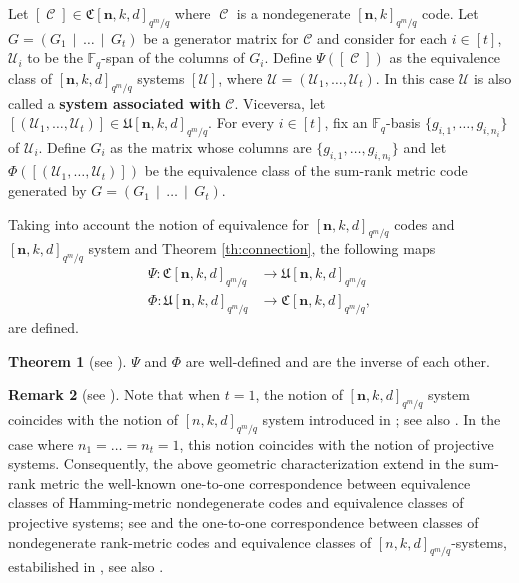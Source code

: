 \documentclass[11pt]{amsart}
\DeclareMathOperator{\C}{\mathcal{C}}
\theoremstyle{definition}
\newtheorem{theorem}{Theorem}[section]
\newtheorem{remark}[theorem]{Remark}
\newcommand{\cC}{{\mathcal C}}
\newcommand{\F}{{\mathbb F}}
\newcommand{\bfn}{\mathbf {n}}
\newcommand{\Fq}{{\mathbb F}_{q}}
\newcommand{\Fmnk}{[\bfn,k]_{q^m/q}}
\newcommand{\Fmnkd}{[\bfn,k,d]_{q^m/q}}
\newcommand{\Fmkd}{[n,k,d]_{q^m/q}}
\begin{document}
Let $[\C]\in\mathfrak{C}\Fmnkd$ where $\C$ is a nondegenerate $\Fmnk$ code. Let $G=(G_1 \,\mid\, \ldots \,\mid\, G_t)$ be a generator matrix for $\cC$ and consider for each $i\in[t]$, $\mathcal{U}_i$ to be the $\Fq$-span of the columns of $G_i$. Define $\Psi([\C])$ as the equivalence class of $\Fmnkd$ systems $[\mathcal{U}]$, where $\mathcal{U}=(\mathcal{U}_1,\ldots,\mathcal{U}_t)$. In this case $\mathcal{U}$ is also called a \textbf{system associated with} $\cC$. Viceversa, let $[(\mathcal{U}_1,\ldots,\mathcal{U}_t)]\in\mathfrak{U}\Fmnkd$. For every $i\in[t]$, fix an $\F_q$-basis $\{g_{i,1}, \ldots, g_{i,n_i}\}$ of $\mathcal{U}_i$. Define $G_i$ as the matrix whose columns are $\{g_{i,1}, \ldots, g_{i,n_i}\}$ and let $\Phi([(\mathcal{U}_1,\ldots,\mathcal{U}_t)])$ be the equivalence class of the sum-rank metric code generated by $G=(G_1 \,\mid\, \ldots \,\mid\, G_t)$. 

Taking into account the notion of equivalence for $\Fmnkd$ codes and $\Fmnkd$ system and Theorem \ref{th:connection}, the following maps
\begin{align*}
    \Psi :  \mathfrak{C}\Fmnkd &\to\mathfrak{U}\Fmnkd \\
    \Phi : \mathfrak{U}\Fmnkd &\to \mathfrak{C}\Fmnkd,
\end{align*}
are defined.

\begin{theorem} [see \textnormal{\cite[Theorem 3.7]{neri2023geometry}}] %
$\Psi$ and $\Phi$ are well-defined and are the inverse of each other.
\end{theorem}






\medskip


\begin{remark} [see \textnormal{\cite[Remark 3.9]{neri2023geometry}}]
Note that when $t=1$, the notion of $\Fmnkd$ system coincides with the notion of $[n,k,d]_{q^m/q}$ system introduced in \cite{Randrianarisoa2020ageometric}; see also \cite{alfarano2022linear}. In the case where $n_1=\ldots=n_t=1$, this notion coincides with the notion of projective systems. Consequently, the above geometric characterization extend in the sum-rank metric the well-known one-to-one correspondence between equivalence classes of Hamming-metric nondegenerate codes and equivalence classes of projective systems; see \cite[Theorem 1.1.6]{vladut2007algebraic} and the one-to-one correspondence between classes of nondegenerate rank-metric codes and equivalence classes of $\Fmkd$-systems, estabilished in \cite{sheekeysurvey,Randrianarisoa2020ageometric}, see also \cite{alfarano2022linear}.
\end{remark}
\end{document}
